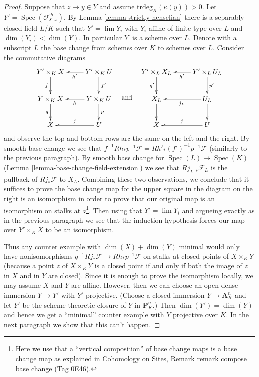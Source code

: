 \documentclass{amsart}
\theoremstyle{plain}
\theoremstyle{definition}
\theoremstyle{remark}
\numberwithin{equation}{subsection}
\def\lim{\mathop{\mathrm{lim}}\nolimits}
\def\Spec{\mathop{\mathrm{Spec}}}
\begin{document}
\begin{proof}
\medskip\noindent
Suppose that $z \mapsto y \in Y$ and assume $\text{trdeg}_K(\kappa(y)) > 0$.
Let $Y' = \Spec(\mathcal{O}_{X, x}^{sh})$.
By Lemma \ref{lemma-strictly-henselian} there is a separably closed field
$L/K$ such that $Y' = \lim Y_i$ with $Y_i$ affine of finite type over $L$
and $\dim(Y_i) < \dim(Y)$. In particular $Y'$ is a scheme over $L$.
Denote with a subscript $L$ the base change from schemes over $K$
to schemes over $L$. Consider the commutative diagrams
$$
\vcenter{
\xymatrix{
Y' \times_K X \ar[d]_f  &
Y' \times_K U \ar[l]^{h'} \ar[d]^{f'} \\
Y \times_K X \ar[d]_q  &
Y \times_K U \ar[l]^h \ar[d]^p \\
X & U \ar[l]_j
}
}
\quad\text{and}\quad
\vcenter{
\xymatrix{
Y' \times_L X_L \ar[d]_{q'}  &
Y' \times_L U_L \ar[l]^{h'} \ar[d]^{p'} \\
X_L \ar[d] &
U_L \ar[l]^{j_L} \ar[d] \\
X & U \ar[l]_j
}
}
$$
and observe the top and bottom rows are the same on the left and the right.
By smooth base change we see that
$f^{-1}Rh_*p^{-1}\mathcal{F} = Rh'_*(f')^{-1}p^{-1}\mathcal{F}$
(similarly to the previous paragraph).
By smooth base change for $\Spec(L) \to \Spec(K)$
(Lemma \ref{lemma-base-change-field-extension})
we see that $Rj_{L, *}\mathcal{F}_L$ is the pullback of
$Rj_*\mathcal{F}$ to $X_L$. Combining these two observations,
we conclude that it suffices to prove the base change map
for the upper square in the diagram on the right
is an isomorphism in order to prove that our original
map is an isomorphism on stalks at $\overline{z}$\footnote{Here we
use that a ``vertical composition'' of base change maps is a base change
map as explained in Cohomology on Sites, Remark
\href{https://stacks.math.columbia.edu/tag/0E46}{remark compose base change (Tag 0E46)}.}.
Then using that $Y' = \lim Y_i$ and argueing exactly
as in the previous paragraph we see that the induction
hypothesis forces our map over $Y' \times_K X$ to be
an isomorphism.

\medskip\noindent
Thus any counter example with $\dim(X) + \dim(Y)$ minimal
would only have nonisomorphisms
$q^{-1}Rj_*\mathcal{F} \to Rh_*p^{-1}\mathcal{F}$
on stalks at closed points of $X \times_K Y$ (because a point
$z$ of $X \times_K Y$ is a closed point if and only if
both the image of $z$ in $X$ and in $Y$ are closed).
Since it is enough to prove the isomorphism locally,
we may assume $X$ and $Y$ are affine. However, then
we can choose an open dense immersion $Y \to Y'$ with $Y'$
projective. (Choose a closed immersion $Y \to \mathbf{A}^n_K$
and let $Y'$ be the scheme theoretic closure of $Y$ in
$\mathbf{P}^n_K$.) Then $\dim(Y') = \dim(Y)$ and hence
we get a ``minimal'' counter example with $Y$ projective over $K$.
In the next paragraph we show that this can't happen.


\end{proof}
\end{document}
